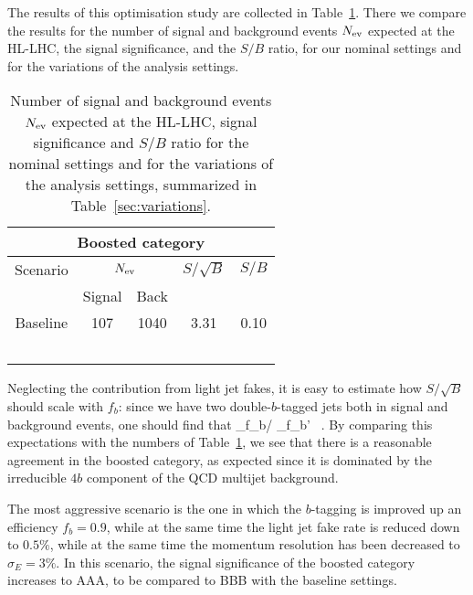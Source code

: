 The results of this optimisation study are collected in
Table~\ref{table:cutflowMVAoptimisation}.
%
There we compare the results for the number of signal
and background events $N_{\rm ev}$ expected at the
HL-LHC, the signal significance, and the $S/B$ ratio,
for our nominal settings and for the variations
of the analysis settings.

\begin{table}[t]
  \centering
  \begin{tabular}{c||c|c|c|c}
    \hline
    \multicolumn{5}{c}{Boosted category}\\
    \hline
    \hline
 Scenario &    \multicolumn{2}{c|}{$N_{\rm ev}$} &  $S/\sqrt{B}$  & $S/B$ \\
       &   Signal & Back   &     &    \\
 \hline
 \hline
   Baseline   & 107 & 1040 & 3.31  & 0.10\\
   \hline
   &  &   &   &   \\
   &  &   &   &   \\
   &  &   &   &   \\
   &  &   &   &   \\
         &  &   &   &   \\
   \hline
  \end{tabular}
  \caption{\small
Number of signal
and background events $N_{\rm ev}$ expected at the
HL-LHC, signal significance and $S/B$ ratio
for the nominal settings and for the variations
of the analysis settings, summarized
in  Table~\ref{sec:variations}.
 \label{table:cutflowMVAoptimisation}
  }
\end{table}

Neglecting the
contribution from light jet fakes,
it is easy to estimate how $S/\sqrt{B}$ should
scale with $f_b$: since we have two double-$b$-tagged jets
both in signal and background events, one should find that
\be
\lp {} \rp _{f_b}\Bigg/
\lp {} \rp_{f_b'}
\simeq {} \, .
\ee
By comparing this expectations with the numbers of
Table~\ref{table:cutflowMVAoptimisation}, we see that there
is a reasonable agreement in the boosted category,
as expected since it is dominated by the irreducible
$4b$ component of the QCD multijet background.

The most aggressive scenario is the one in which the $b$-tagging
is improved up an efficiency $f_b=0.9$, while at the same
time the light jet fake rate is reduced down to $0.5\%$, while
at the same time the momentum resolution has been decreased
to $\sigma_E=3\%$.
%
In this scenario, the signal significance of the boosted category
increases to AAA, to be compared to BBB with the baseline settings.
